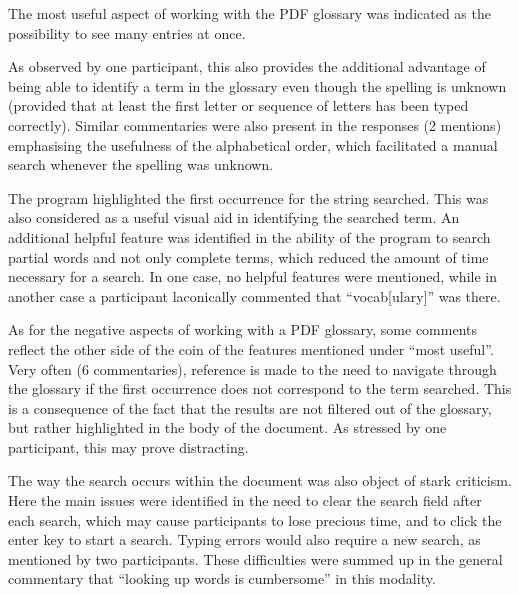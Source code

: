 The most useful aspect of working with the PDF glossary was indicated as the possibility to see many entries at once.

As observed by one participant, this also provides the additional advantage of being able to identify a term in the glossary even though the spelling is unknown (provided that at least the first letter or sequence of letters has been typed correctly). Similar commentaries were also present in the responses (2 mentions) emphasising the usefulness of the alphabetical order, which facilitated a manual search whenever the spelling was unknown.

The program highlighted the first occurrence for the string searched. This was also considered as a useful visual aid in identifying the searched term. An additional helpful feature was identified in the ability of the program to search partial words and not only complete terms, which reduced the amount of time necessary for a search. In one case, no helpful features were mentioned, while in another case a participant laconically commented that ``vocab[ulary]'' was there.

As for the negative aspects of working with a PDF glossary, some comments reflect the other side of the coin of the features mentioned under ``most useful''. Very often (6 commentaries), reference is made to the need to navigate through the glossary if the first occurrence does not correspond to the term searched. This is a consequence of the fact that the results are not filtered out of the glossary, but rather highlighted in the body of the document. As stressed by one participant, this may prove distracting.

The way the search occurs within the document was also object of stark criticism. Here the main issues were identified in the need to clear the search field after each search, which may cause participants to lose precious time, and to click the enter key to start a search. Typing errors would also require a new search, as mentioned by two participants. These difficulties were summed up in the general commentary that ``looking up words is cumbersome'' in this modality.

